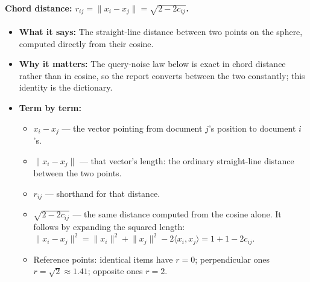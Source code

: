 \documentclass[11pt,letterpaper]{article}
\begin{document}
\paragraph{Chord distance: $r_{ij} = \lVert x_i - x_j \rVert = \sqrt{2 - 2
c_{ij}}$.}
\begin{itemize}
  \item \textbf{What it says:} The straight-line distance between two
  points on the sphere, computed directly from their cosine.
  \item \textbf{Why it matters:} The query-noise law below is exact in
  chord distance rather than in cosine, so the report converts between the two
  constantly; this identity is the dictionary.
  \item \textbf{Term by term:}
    \begin{itemize}
    \item $x_i - x_j$ --- the vector pointing from document $j$'s position
    to document $i$'s.
    \item $\lVert x_i - x_j \rVert$ --- that vector's length: the ordinary
    straight-line distance between the two points.
    \item $r_{ij}$ --- shorthand for that distance.
    \item $\sqrt{2 - 2c_{ij}}$ --- the same distance computed from the
    cosine alone. It follows by expanding the squared length: $\lVert x_i -
    x_j \rVert^2 = \lVert x_i \rVert^2 + \lVert x_j \rVert^2 - 2 \langle
    x_i, x_j \rangle = 1 + 1 - 2 c_{ij}$.
    \item Reference points: identical items have $r = 0$; perpendicular
    ones $r = \sqrt 2 \approx 1.41$; opposite ones $r = 2$.
  \end{itemize}
\end{itemize}
\end{document}
